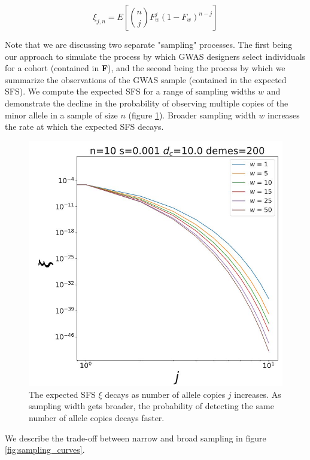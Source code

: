 \begin{equation}\label{eq:sfs}
    \xi_{j,n} = E[{n \choose j} F_w^j(1-F_w)^{n-j}]
\end{equation}


Note that we are discussing two separate "sampling" processes. The first being our approach to simulate the process by which GWAS designers select individuals for a cohort (contained in \textbf{F}), and the second being the process by which we summarize the observations of the GWAS sample (contained in the expected SFS). We compute the expected SFS for a range of sampling widths $w$ and demonstrate the decline in the probability of observing multiple copies of the minor allele in a sample of size $n$ (figure \ref{fig:sfs}). Broader sampling width $w$ increases the rate at which the expected SFS decays. 


\begin{figure}[h]
    \centering
    \includegraphics[scale=0.5]{img/sfs.JPG}
    \caption{The expected SFS $\xi$ decays as number of allele copies $j$ increases. As sampling width gets broader, the probability of detecting the same number of allele copies decays faster.}
    \label{fig:sfs}
\end{figure}


We describe the trade-off between narrow and broad sampling in figure \ref{fig:sampling_curves}. 

